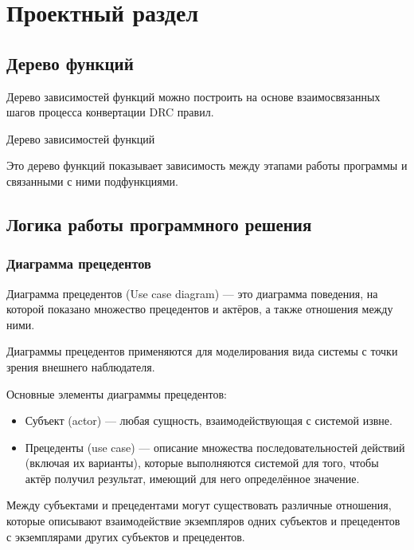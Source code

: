 \chapter{Проектный раздел}

\section{Дерево функций}

Дерево зависимостей функций можно построить на основе взаимосвязанных
шагов процесса конвертации DRC правил.

\begin{image}
	\caption{Дерево зависимостей функций}
	\label{fig:tree}
\end{image}

Это дерево функций показывает зависимость между этапами работы программы
и связанными с ними подфункциями.

\section{Логика работы программного решения}

\subsection{Диаграмма прецедентов}

Диаграмма прецедентов (Use case diagram) --- это диаграмма поведения,
на которой показано множество прецедентов и актёров,
а также отношения между ними.\par
Диаграммы прецедентов применяются для моделирования вида системы
с точки зрения внешнего наблюдателя.\par
Основные элементы диаграммы прецедентов:

\begin{itemize}
	\item Субъект (actor) --- любая сущность,
		взаимодействующая с системой извне.
	\item Прецеденты (use case) --- описание множества последовательностей
		действий (включая их варианты),
		которые выполняются системой для того,
		чтобы актёр получил результат,
		имеющий для него определённое значение.
\end{itemize}

Между субъектами и прецедентами могут существовать различные отношения,
которые описывают взаимодействие экземпляров одних субъектов
и прецедентов с экземплярами других субъектов и прецедентов.

